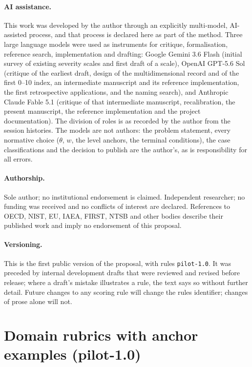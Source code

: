 \documentclass[11pt,a4paper]{article}
\begin{document}
\paragraph{AI assistance.} This work was developed by the author through an explicitly multi-model, AI-assisted process, and that process is declared here as part of the method. Three large language models were used as instruments for critique, formalisation, reference search, implementation and drafting: Google Gemini 3.6 Flash (initial survey of existing severity scales and first draft of a scale), OpenAI GPT-5.6 Sol (critique of the earliest draft, design of the multidimensional record and of the first 0--10 index, an intermediate manuscript and its reference implementation, the first retrospective applications, and the naming search), and Anthropic Claude Fable 5.1 (critique of that intermediate manuscript, recalibration, the present manuscript, the reference implementation and the project documentation). The division of roles is as recorded by the author from the session histories. The models are not authors: the problem statement, every normative choice ($\theta$, $w$, the level anchors, the terminal conditions), the case classifications and the decision to publish are the author's, as is responsibility for all errors.
\paragraph{Authorship.} Sole author; no institutional endorsement is claimed. Independent researcher; no funding was received and no conflicts of interest are declared. References to OECD, NIST, EU, IAEA, FIRST, NTSB and other bodies describe their published work and imply no endorsement of this proposal.
\paragraph{Versioning.} This is the first public version of the proposal, with rules \texttt{pilot-1.0}. It was preceded by internal development drafts that were reviewed and revised before release; where a draft's mistake illustrates a rule, the text says so without further detail. Future changes to any scoring rule will change the rules identifier; changes of prose alone will not.




\appendix

\section{Domain rubrics with anchor examples (pilot-1.0)}
\label{app:rubrics}
\end{document}
